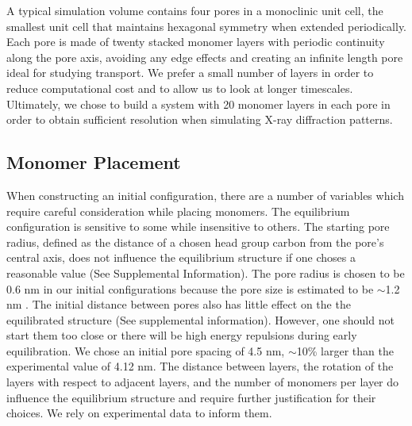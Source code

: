 \documentclass{article}
\begin{document}
  A typical simulation volume contains four pores in a monoclinic unit cell,
  the smallest unit cell that maintains hexagonal symmetry when extended
  periodically. Each pore is made of twenty stacked monomer layers with periodic
  continuity along the pore axis, avoiding any edge effects and creating an
  infinite length pore ideal for studying transport. We prefer a small number of layers
  in order to reduce computational cost and to allow us to look at
  longer timescales. Ultimately, we chose to build a system with 20 monomer
  layers in each pore in order to obtain sufficient resolution when simulating
  X-ray diffraction patterns. %

\subsection{Monomer Placement} 

  When constructing an initial configuration, there are a number of variables
  which require careful consideration while placing monomers. The equilibrium
  configuration is sensitive to some while insensitive to others. The starting
  pore radius, defined as the distance of a chosen head group carbon from the
  pore's central axis, does not influence the equilibrium structure if one choses
  a reasonable value (See Supplemental Information). The pore radius is chosen to
  be 0.6 nm in our initial configurations because the pore size is estimated to
  be $\sim$1.2 nm \cite{zhou_supported_2005}. The initial distance between pores
  also has little effect on the the equilibrated structure (See supplemental
  information). However, one should not start them too close or there will be
  high energy repulsions during early equilibration. We chose an initial pore
  spacing of 4.5 nm, $\sim$10\% larger than the experimental value of 4.12 nm.
  The distance between layers, the rotation of the layers with respect to
  adjacent layers, and the number of monomers per layer do influence the
  equilibrium structure and require further justification for their choices.  We
  rely on experimental data to inform them. 
\end{document}
